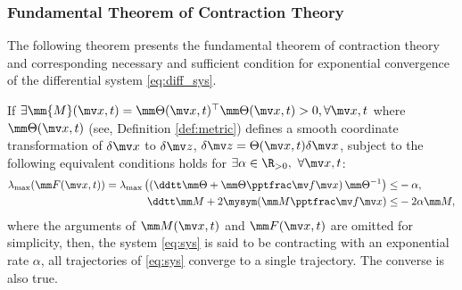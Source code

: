 \subsubsection{Fundamental Theorem of Contraction Theory}

The following theorem presents the fundamental theorem of contraction theory and corresponding necessary and sufficient condition for exponential convergence of the differential system \eqref{eq:diff_sys}.

\begin{theorem}
    If $
        \exists \mm{M}(\bdx,t)
        =
        \mm\Theta(\bdx,t)^\top
        \mm\Theta(\bdx,t)
        > 0, \forall \bdx,t
    $ where $\mm\Theta(\bdx,t)$ (see, Definition \ref{def:metric}) defines a smooth coordinate transformation of $\delta\bdx$ to $\delta\bdz$, \ie $\delta\bdz = \Theta(\bdx,t)\delta\bdx$, subject to the following equivalent conditions holds for $\exists\alpha\in\R_{>0},\ \forall \bdx,t$:
    \begin{subequations}
        \begin{align}
            \lambda_{\max} (
                \mm F(\bdx,t)
            )
            =
            \lambda_{\max} 
            \left(
                \left(    
                \ddtt \mm\Theta
                +
                \mm\Theta\tpfpx
                \right)
                \mm\Theta^{-1}
            \right)
            \le&
            -\alpha
            ,
        \label{eq:ctrac:metric:F}
            \\
            \ddtt \mm M
            +
            2\mysym(\mm M\tpfpx)
            \le&
            -2\alpha\mm M
            ,
        \label{eq:ctrac:metric:M}
        \end{align}
        \label{eq:ctrac:metric}
    \end{subequations}
    where the arguments of $\mm M(\bdx,t)$ and $\mm F(\bdx,t)$ are omitted for simplicity, then, the system \eqref{eq:sys} is said to be contracting with an exponential rate $\alpha$, \ie all trajectories of \eqref{eq:sys} converge to a single trajectory.
    The converse is also true.
    \label{thm:ctrac:main}
\end{theorem}

